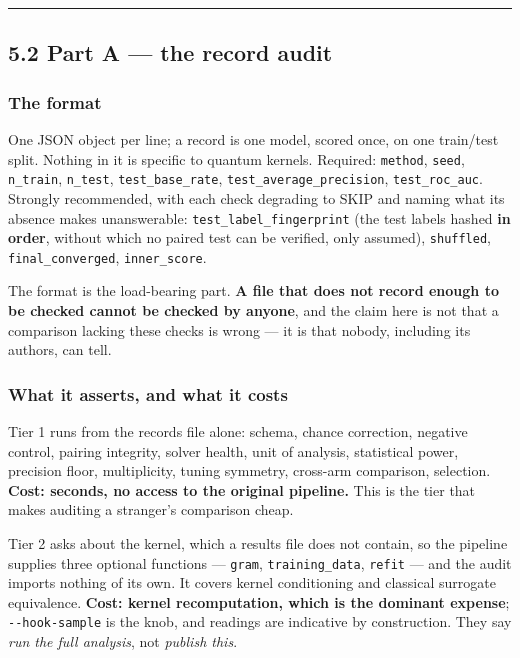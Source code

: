 \documentclass[
  10pt,
]{article}
\begin{document}
\begin{center}\rule{0.5\linewidth}{0.5pt}\end{center}

\subsection{5.2 Part A --- the record
audit}\label{part-a-the-record-audit}

\subsubsection{The format}\label{the-format}

One JSON object per line; a record is one model, scored once, on one
train/test split. Nothing in it is specific to quantum kernels.
Required: \texttt{method}, \texttt{seed}, \texttt{n\_\allowbreak{}train},
\texttt{n\_\allowbreak{}test}, \texttt{test\_\allowbreak{}base\_\allowbreak{}rate},
\texttt{test\_\allowbreak{}average\_\allowbreak{}precision}, \texttt{test\_\allowbreak{}roc\_\allowbreak{}auc}. Strongly
recommended, with each check degrading to SKIP and naming what its
absence makes unanswerable: \texttt{test\_\allowbreak{}label\_\allowbreak{}fingerprint} (the test
labels hashed \textbf{in order}, without which no paired test can be
verified, only assumed), \texttt{shuffled}, \texttt{final\_\allowbreak{}converged},
\texttt{inner\_\allowbreak{}score}.

The format is the load-bearing part. \textbf{A file that does not record
enough to be checked cannot be checked by anyone}, and the claim here is
not that a comparison lacking these checks is wrong --- it is that
nobody, including its authors, can tell.

\subsubsection{What it asserts, and what it
costs}\label{what-it-asserts-and-what-it-costs}

Tier 1 runs from the records file alone: schema, chance correction,
negative control, pairing integrity, solver health, unit of analysis,
statistical power, precision floor, multiplicity, tuning symmetry,
cross-arm comparison, selection. \textbf{Cost: seconds, no access to the
original pipeline.} This is the tier that makes auditing a stranger's
comparison cheap.

Tier 2 asks about the kernel, which a results file does not contain, so
the pipeline supplies three optional functions --- \texttt{gram},
\texttt{training\_\allowbreak{}data}, \texttt{refit} --- and the audit imports
nothing of its own. It covers kernel conditioning and classical
surrogate equivalence. \textbf{Cost: kernel recomputation, which is the
dominant expense}; \texttt{-\/-hook-sample} is the knob, and readings
are indicative by construction. They say \emph{run the full analysis},
not \emph{publish this}.
\end{document}
